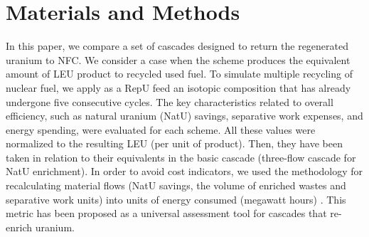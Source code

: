\documentclass[a4paper]{jpconf}
\begin{document}
\section{Materials and Methods}
In this paper, we compare a set of cascades designed to return the regenerated uranium to NFC. We consider a case when the scheme produces the equivalent amount of LEU product to recycled used fuel. To simulate multiple recycling of nuclear fuel, we apply as a RepU feed an isotopic composition that has already undergone five consecutive cycles. The key characteristics related to overall efficiency, such as natural uranium (NatU) savings, separative work expenses, and energy spending, were evaluated for each scheme. All these values were normalized to the resulting LEU (per unit of product). Then, they have been taken in relation to their equivalents in the basic cascade (three-flow cascade for NatU enrichment).
In order to avoid cost indicators, we used the methodology for recalculating material flows (NatU savings, the volume of enriched wastes and separative work units) into units of energy consumed (megawatt hours)  \cite{rodionovaAnalizTehnikoekonomicheskihHarakteristik2019a}. This metric has been proposed as a universal assessment tool for cascades that re-enrich uranium. 
\end{document}
